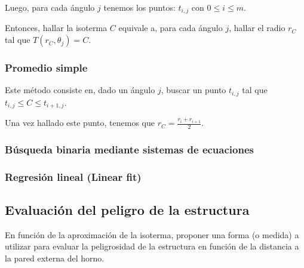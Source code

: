 Luego, para cada ángulo $j$ tenemos los puntos: $t_{i,j}$ con $0 \leq i \leq m$.

Entonces, hallar la isoterma $C$ equivale a, para cada ángulo $j$, hallar el radio $r_C$ tal que $T(r_C, \theta_j) = C$.

\subsubsection{Promedio simple}

Este método consiste en, dado un ángulo $j$, buscar un punto $t_{i,j}$ tal que $t_{i,j} \leq C \leq t_{i+1,j}$.

Una vez hallado este punto, tenemos que $r_C = \frac{r_i + r_{i+1}}{2}$.

\subsubsection{Búsqueda binaria mediante sistemas de ecuaciones}

\subsubsection{Regresión lineal (Linear fit)}


\subsection{Evaluación del peligro de la estructura}

En función de la aproximación de la isoterma, proponer una forma (o medida) a utilizar para evaluar la peligrosidad de la estructura en función de la distancia a la pared externa del horno.
